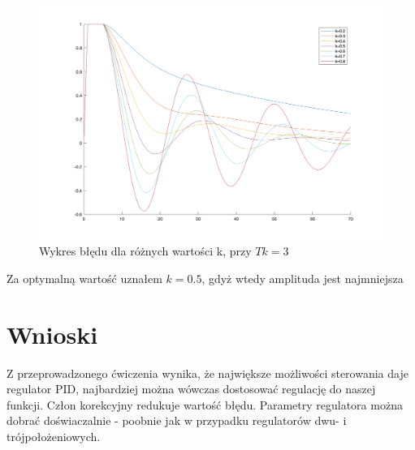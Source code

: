 \documentclass[a4paper,10pt]{article}
\begin{document}
\newpage

\begin{figure}[!h]
	\centering
	\includegraphics[width=120mm]{do_k.png}
	\caption{Wykres błędu dla różnych wartości k, przy $Tk=3$}
	\label{fig:Wykres }
\end{figure}
Za optymalną wartość uznałem  $k=0.5$, gdyż wtedy amplituda jest najmniejsza




\section{Wnioski}\label{sec:wnioski}
Z przeprowadzonego ćwiczenia wynika, że największe możliwości sterowania daje regulator PID, najbardziej można wówczas dostosować regulację do naszej funkcji. Człon korekcyjny redukuje wartość błędu. Parametry regulatora można dobrać doświaczalnie - poobnie jak w przypadku regulatorów dwu- i trójpołożeniowych.
\end{document}
